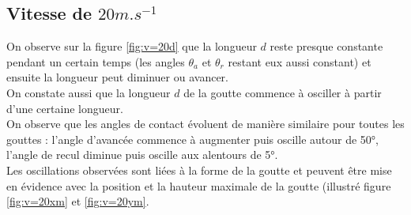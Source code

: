 \documentclass[french]{article}
\begin{document}
\newpage
\subsection{Vitesse de $20m.s^{-1}$}

On observe sur la figure \ref{fig:v=20d} que la longueur $d$ reste presque constante pendant un certain temps (les angles $\theta_{a}$ et $\theta_{r}$ restant eux aussi constant) et ensuite la longueur peut diminuer ou avancer.\\

On constate aussi que la longueur $d$ de la goutte commence à osciller à partir d'une certaine longueur.\\

On observe que les angles de contact évoluent de manière similaire pour toutes les gouttes : l'angle d'avancée commence à augmenter puis oscille autour de \ang{50}, l'angle de recul diminue puis oscille aux alentours de \ang{5}.\\

Les oscillations observées sont liées à la forme de la goutte et peuvent être mise en évidence avec la position et la hauteur maximale de la goutte (illustré figure \ref{fig:v=20xm} et \ref{fig:v=20ym}.\\
\end{document}
